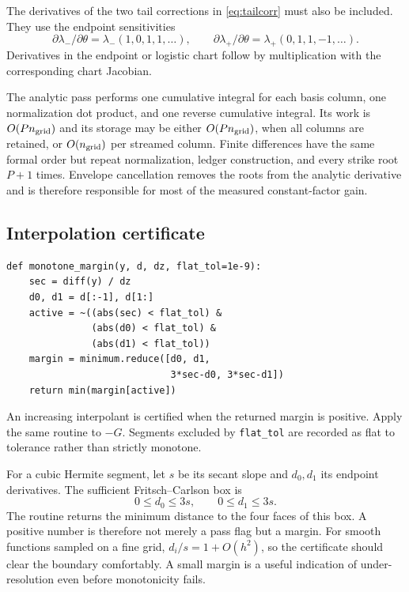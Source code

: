 The derivatives of the two tail corrections in \eqref{eq:tailcorr} must also
be included.  They use the endpoint sensitivities
\[
\partial\lambda_-/\partial\theta
=\lambda_-(1,0,1,1,\ldots),
\qquad
\partial\lambda_+/\partial\theta
=\lambda_+(0,1,1,-1,\ldots).
\]
Derivatives in the endpoint or logistic chart follow by multiplication with
the corresponding chart Jacobian.

The analytic pass performs one cumulative integral for each basis column, one
normalization dot product, and one reverse cumulative integral.  Its work is
$O(Pn_{\rm grid})$ and its storage may be either
$O(Pn_{\rm grid})$, when all columns are retained, or $O(n_{\rm grid})$ per
streamed column.  Finite differences have the same formal order but repeat
normalization, ledger construction, and every strike root $P+1$ times.
Envelope cancellation removes the roots from the analytic derivative and is
therefore responsible for most of the measured constant-factor gain.

\subsection{Interpolation certificate}

\begin{lstlisting}[caption={Fritsch--Carlson margin for a uniform-grid
Hermite interpolant.}]
def monotone_margin(y, d, dz, flat_tol=1e-9):
    sec = diff(y) / dz
    d0, d1 = d[:-1], d[1:]
    active = ~((abs(sec) < flat_tol) &
               (abs(d0) < flat_tol) &
               (abs(d1) < flat_tol))
    margin = minimum.reduce([d0, d1,
                             3*sec-d0, 3*sec-d1])
    return min(margin[active])
\end{lstlisting}

An increasing interpolant is certified when the returned margin is positive.
Apply the same routine to $-G$.  Segments excluded by
\texttt{flat\_tol} are recorded as flat to tolerance rather than strictly
monotone.

For a cubic Hermite segment, let $s$ be its secant slope and $d_0,d_1$ its
endpoint derivatives.  The sufficient Fritsch--Carlson box is
\[
0\le d_0\le3s,\qquad 0\le d_1\le3s.
\]
The routine returns the minimum distance to the four faces of this box.  A
positive number is therefore not merely a pass flag but a margin.  For smooth
functions sampled on a fine grid, $d_i/s=1+O(h^2)$, so the certificate should
clear the boundary comfortably.  A small margin is a useful indication of
under-resolution even before monotonicity fails.

